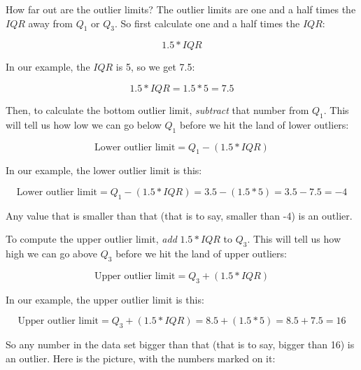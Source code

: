 \documentclass[../../../main.tex]{subfiles}
\begin{document}
How far out are the outlier limits? The outlier limits are one and a half times the $IQR$ away from $Q_{1}$ or $Q_{3}$. So first calculate one and a half times the $IQR$:

\begin{equation*}
  1.5 * IQR
\end{equation*}

\noindent
In our example, the $IQR$ is 5, so we get 7.5:

\begin{equation*}
  1.5 * IQR = 1.5 * 5 = 7.5
\end{equation*}

\noindent
Then, to calculate the bottom outlier limit, \emph{subtract} that number from $Q_{1}$. This will tell us how low we can go below $Q_{1}$ before we hit the land of lower outliers:

\begin{equation*}
  \text{Lower outlier limit} = Q_{1} - (1.5 * IQR)
\end{equation*}

\noindent
In our example, the lower outlier limit is this:

\begin{equation*}
  \text{Lower outlier limit} = Q_{1} - (1.5 * IQR) = 3.5 - (1.5 * 5) = 3.5 - 7.5 = -4
\end{equation*}

\noindent
Any value that is smaller than that (that is to say, smaller than -4) is an outlier.

To compute the upper outlier limit, \emph{add} $1.5 * IQR$ to $Q_{3}$. This will tell us how high we can go above $Q_{3}$ before we hit the land of upper outliers:

\begin{equation*}
  \text{Upper outlier limit} = Q_{3} + (1.5 * IQR)
\end{equation*}

\noindent
In our example, the upper outlier limit is this:

\begin{equation*}
  \text{Upper outlier limit} = Q_{3} + (1.5 * IQR) = 8.5 + (1.5 * 5) = 8.5 + 7.5 = 16
\end{equation*}

\noindent
So any number in the data set bigger than that (that is to say, bigger than 16) is an outlier. Here is the picture, with the numbers marked on it:
\end{document}
